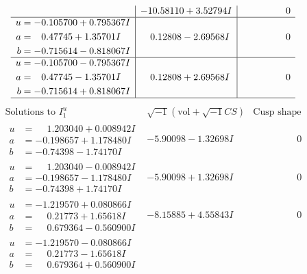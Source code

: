 \documentclass[1p]{elsarticle_modified}
\theoremstyle{definition}
\newcommand{\I}{\sqrt{-1}}
\begin{document}
$$\begin{array}{c|c|c}
 & -10.58110 + 3.52794 I & \phantom{-0.000000 } 0 \\ \hline\begin{aligned}
u &= -0.105700 + 0.795367 I \\
a &= \phantom{-}0.47745 + 1.35701 I \\
b &= -0.715614 - 0.818067 I\end{aligned}
 & \phantom{-}0.12808 - 2.69568 I & \phantom{-0.000000 } 0 \\ \hline\begin{aligned}
u &= -0.105700 - 0.795367 I \\
a &= \phantom{-}0.47745 - 1.35701 I \\
b &= -0.715614 + 0.818067 I\end{aligned}
 & \phantom{-}0.12808 + 2.69568 I & \phantom{-0.000000 } 0\\
 \hline 
 \end{array}$$\newpage$$\begin{array}{c|c|c}  
\text{Solutions to }I^u_{1}& \I (\text{vol} + \sqrt{-1}CS) & \text{Cusp shape}\\
 \hline 
\begin{aligned}
u &= \phantom{-}1.203040 + 0.008942 I \\
a &= -0.198657 + 1.178480 I \\
b &= -0.74398 - 1.74170 I\end{aligned}
 & -5.90098 - 1.32698 I & \phantom{-0.000000 } 0 \\ \hline\begin{aligned}
u &= \phantom{-}1.203040 - 0.008942 I \\
a &= -0.198657 - 1.178480 I \\
b &= -0.74398 + 1.74170 I\end{aligned}
 & -5.90098 + 1.32698 I & \phantom{-0.000000 } 0 \\ \hline\begin{aligned}
u &= -1.219570 + 0.080866 I \\
a &= \phantom{-}0.21773 + 1.65618 I \\
b &= \phantom{-}0.679364 - 0.560900 I\end{aligned}
 & -8.15885 + 4.55843 I & \phantom{-0.000000 } 0 \\ \hline\begin{aligned}
u &= -1.219570 - 0.080866 I \\
a &= \phantom{-}0.21773 - 1.65618 I \\
b &= \phantom{-}0.679364 + 0.560900 I\end{aligned}

\end{array}$$
\end{document}
